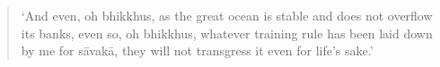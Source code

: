 \clearpage
\thispagestyle{empty}

\mbox{}
\vfill

\begin{quote}
`And even, oh bhikkhus, as the great ocean
is stable and does not overflow its banks,
even so, oh bhikkhus, whatever training
rule has been laid down by me for sāvakā,
they will not transgress it even for life’s
sake.'
\end{quote}


\vfill
\mbox{}

